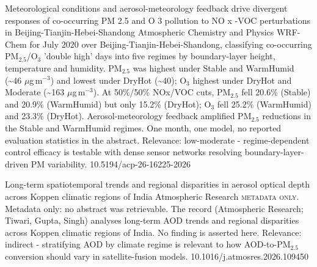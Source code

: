 \documentclass[10pt]{article}
\begin{document}
{Meteorological conditions and aerosol-meteorology feedback drive divergent responses of co-occurring PM 2.5 and O 3 pollution to NO x -VOC perturbations in Beijing-Tianjin-Hebei-Shandong}
{Atmospheric Chemistry and Physics}
{WRF-Chem for July 2020 over Beijing-Tianjin-Hebei-Shandong, classifying co-occurring PM$_{2.5}$/O$_3$ 'double high' days into five regimes by boundary-layer height, temperature and humidity. PM$_{2.5}$ was highest under Stable and WarmHumid (\textasciitilde{}46 $\mu$g\,m$^{-3}$) and lowest under DryHot (\textasciitilde{}40); O$_3$ highest under DryHot and Moderate (\textasciitilde{}163 $\mu$g\,m$^{-3}$). At 50\%/50\% NOx/VOC cuts, PM$_{2.5}$ fell 20.6\% (Stable) and 20.9\% (WarmHumid) but only 15.2\% (DryHot); O$_3$ fell 25.2\% (WarmHumid) and 23.3\% (DryHot). Aerosol-meteorology feedback amplified PM$_{2.5}$ reductions in the Stable and WarmHumid regimes. One month, one model, no reported evaluation statistics in the abstract. Relevance: low-moderate - regime-dependent control efficacy is testable with dense sensor networks resolving boundary-layer-driven PM variability.}
{10.5194/acp-26-16225-2026}

{Long-term spatiotemporal trends and regional disparities in aerosol optical depth across Koppen climatic regions of India}
{Atmospheric Research}
{\textsc{metadata only.} Metadata only: no abstract was retrievable. The record (Atmospheric Research; Tiwari, Gupta, Singh) analyses long-term AOD trends and regional disparities across Koppen climatic regions of India. No finding is asserted here. Relevance: indirect - stratifying AOD by climate regime is relevant to how AOD-to-PM$_{2.5}$ conversion should vary in satellite-fusion models.}
{10.1016/j.atmosres.2026.109450}

\par{}\baselineskip{}\baselineskip
{}
\end{document}
